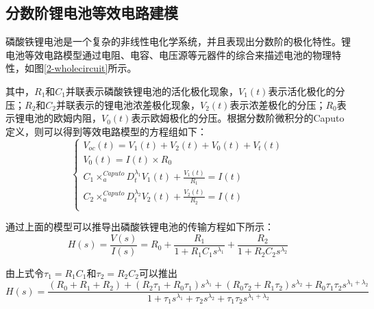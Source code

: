 \subsection{分数阶锂电池等效电路建模}
磷酸铁锂电池是一个复杂的非线性电化学系统，并且表现出分数阶的极化特性。锂电池等效电路模型通过电阻、电容、电压源等元器件的综合来描述电池的物理特性，如图\ref{2-wholecircuit}所示。

其中，${{R}_{1}}$和${{C}_{1}}$并联表示磷酸铁锂电池的活化极化现象，${{V}_{1}}(t)$表示活化极化的分压；${{R}_{2}}$和${{C}_{2}}$并联表示的锂电池浓差极化现象，${{V}_{2}}(t)$表示浓差极化的分压；${{R}_{0}}$表示锂电池的欧姆内阻，${{V}_{0}}(t)$表示欧姆极化的分压。根据分数阶微积分的Caputo定义，则可以得到等效电路模型的方程组如下：
\begin{equation}
\left\{ \begin{array}{l}
   {{V}_{oc}}(t)={{V}_{1}}(t)+{{V}_{2}}(t)+{{V}_{0}}(t)+{{V}_{t}}(t) \\ 
  {{V}_{0}}(t)=I(t)\times {{R}_{0}} \\ 
  {{C}_{1}}\times _{a}^{Caputo}D_{t}^{{{\lambda }_{1}}}{{V}_{1}}(t)+\frac{{{V}_{1}}(t)}{{{R}_{1}}}=I(t) \\ 
  {{C}_{2}}\times _{a}^{Caputo}D_{t}^{{{\lambda }_{2}}}{{V}_{2}}(t)+\frac{{{V}_{2}}(t)}{{{R}_{2}}}=I(t) \\ 
 \end{array} \right.
\end{equation}

通过上面的模型可以推导出磷酸铁锂电池的传输方程如下所示：
\begin{equation}
H(s)=\frac{V(s)}{I(s)}={{R}_{0}}+\frac{{{R}_{1}}}{1+{{R}_{1}}{{C}_{1}}{{s}^{{{\lambda }_{1}}}}}+\frac{{{R}_{2}}}{1+{{R}_{2}}{{C}_{2}}{{s}^{{{\lambda }_{2}}}}}
\end{equation}	 

由上式令${{\tau }_{1}}={{R}_{1}}{{C}_{1}}$和${{\tau }_{2}}={{R}_{2}}{{C}_{2}}$可以推出
\begin{equation}
H\left( s \right)=\frac{\left( {{R}_{0}}+{{R}_{1}}+{{R}_{2}} \right)+\left( {{R}_{2}}{{\tau }_{1}}+{{R}_{0}}{{\tau }_{1}} \right){{s}^{{{\lambda }_{1}}}}+\left( {{R}_{0}}{{\tau }_{2}}+{{R}_{1}}{{\tau }_{2}} \right){{s}^{{{\lambda }_{2}}}}+{{R}_{0}}{{\tau }_{1}}{{\tau }_{2}}{{s}^{{{\lambda }_{1}}+{{\lambda }_{2}}}}}{1+{{\tau }_{1}}{{s}^{{{\lambda }_{1}}}}+{{\tau }_{2}}{{s}^{{{\lambda }_{2}}}}+{{\tau }_{1}}{{\tau }_{2}}{{s}^{{{\lambda }_{1}}+{{\lambda }_{2}}}}}
\end{equation}

